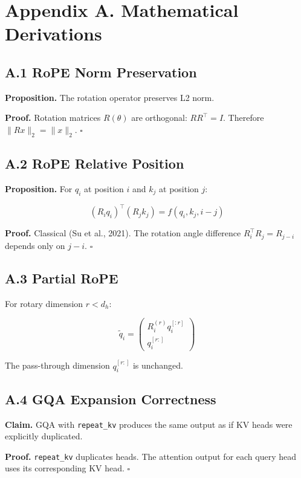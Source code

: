 
\section{Appendix A. Mathematical Derivations}

\subsection{A.1 RoPE Norm Preservation}

\textbf{Proposition.} The rotation operator preserves L2 norm.

\textbf{Proof.} Rotation matrices $R(\theta)$ are orthogonal: $R R^\top = I$. 
Therefore $\|R x\|_2 = \|x\|_2$. $\square$

\subsection{A.2 RoPE Relative Position}

\textbf{Proposition.} For $q_i$ at position $i$ and $k_j$ at position $j$:

\[
(R_i q_i)^\top (R_j k_j) = f(q_i, k_j, i - j)
\tag{A.1}
\]

\textbf{Proof.} Classical (Su et al., 2021). The rotation angle difference 
$R_i^\top R_j = R_{j-i}$ depends only on $j - i$. $\square$

\subsection{A.3 Partial RoPE}

For rotary dimension $r < d_h$:

\[
\tilde{q}_i = \begin{pmatrix} R_i^{(r)} q_i^{[:r]} \\ q_i^{[r:]} \end{pmatrix}
\tag{A.2}
\]

The pass-through dimension $q_i^{[r:]}$ is unchanged.

\subsection{A.4 GQA Expansion Correctness}

\textbf{Claim.} GQA with \texttt{repeat\_kv} produces the same output as if KV heads 
were explicitly duplicated.

\textbf{Proof.} \texttt{repeat\_kv} duplicates heads. The attention output for each 
query head uses its corresponding KV head. $\square$


